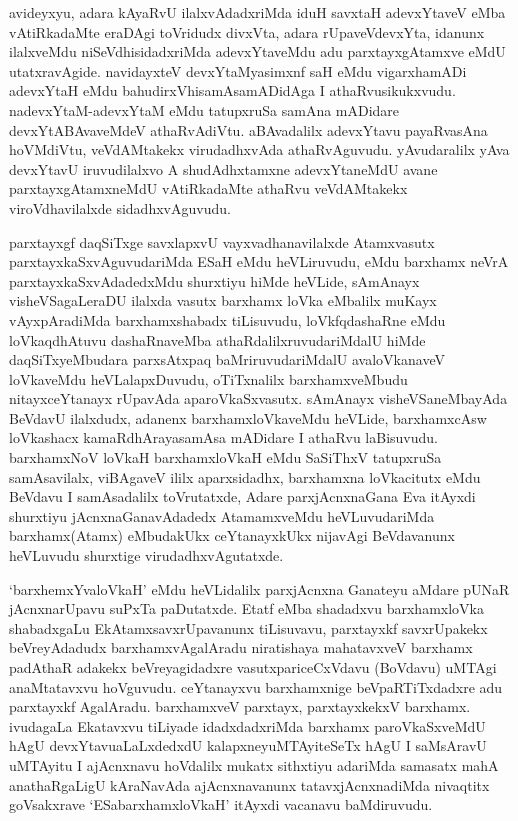 \begin{artha}
avideyxyu, adara kAyaRvU ilalxvAdadxriMda iduH savxtaH adevxYtaveV \stext eMba vAtiRkadaMte eraDAgi toVridudx divxVta, adara rUpaveVdevxYta, idanunx ilalxveMdu niSeVdhisidadxriMda adevxYtaveMdu adu parxtayxgAtamxve eMdU utatxravAgide. navidayxteV devxYtaMyasimxnf saH eMdu vigarxhamADi adevxYtaH eMdu bahudirxVhisamAsamADidAga I athaRvusikukxvudu. nadevxYtaM-adevxYtaM eMdu tatupxruSa samAna mADidare devxYtABAvaveMdeV athaRvAdiVtu. aBAvadalilx adevxYtavu payaRvasAna hoVMdiVtu, veVdAMtakekx virudadhxvAda athaRvAguvudu. yAvudaralilx yAva devxYtavU iruvudilalxvo A shudAdhxtamxne adevxYtaneMdU avane parxtayxgAtamxneMdU vAtiRkadaMte athaRvu veVdAMtakekx viroVdhavilalxde sidadhxvAguvudu. 
\end{artha}%


\begin{artha}
parxtayxgf daqSiTxge savxlapxvU vayxvadhanavilalxde Atamxvasutx parxtayxkaSxvAguvudariMda ESaH eMdu heVLiruvudu, \stext eMdu barxhamx neVrA parxtayxkaSxvAdadedxMdu shurxtiyu hiMde heVLide, sAmAnayx visheVSagaLeraDU ilalxda vasutx barxhamx loVka eMbalilx muKayx vAyxpAradiMda barxhamxshabadx tiLisuvudu, loVkfqdashaRne eMdu loVkaqdhAtuvu dashaRnaveMba athaRdalilxruvudariMdalU hiMde daqSiTxyeMbudara parxsAtxpaq baMriruvudariMdalU avaloVkanaveV loVkaveMdu heVLalapxDuvudu, oTiTxnalilx barxhamxveMbudu nitayxceYtanayx rUpavAda aparoVkaSxvasutx. sAmAnayx visheVSaneMbayAda BeVdavU ilalxdudx, adanenx barxhamxloVkaveMdu heVLide, barxhamxcAsw loVkashacx kamaRdhArayasamAsa mADidare I athaRvu laBisuvudu. barxhamxNoV loVkaH barxhamxloVkaH eMdu SaSiThxV tatupxruSa samAsavilalx, viBAgaveV ililx aparxsidadhx, barxhamxna loVkacitutx eMdu BeVdavu I samAsadalilx toVrutatxde, Adare parxjAcnxnaGana Eva itAyxdi shurxtiyu jAcnxnaGanavAdadedx AtamamxveMdu heVLuvudariMda barxhamx(Atamx) eMbudakUkx ceYtanayxkUkx nijavAgi BeVdavanunx heVLuvudu shurxtige virudadhxvAgutatxde.
\end{artha}

\begin{artha}%
`barxhemxYvaloVkaH' eMdu heVLidalilx parxjAcnxna Ganateyu aMdare pUNaR jAcnxnarUpavu suPxTa paDutatxde. Etatf eMba shadadxvu barxhamxloVka shabadxgaLu EkAtamxsavxrUpavanunx tiLisuvavu, parxtayxkf savxrUpakekx beVreyAdadudx barxhamxvAgalAradu niratishaya mahatavxveV barxhamx padAthaR adakekx beVreyagidadxre vasutxpariceCxVdavu (BoVdavu) uMTAgi anaMtatavxvu hoVguvudu. ceYtanayxvu barxhamxnige beVpaRTiTxdadxre adu parxtayxkf AgalAradu. barxhamxveV parxtayx, parxtayxkekxV barxhamx. ivudagaLa Ekatavxvu tiLiyade idadxdadxriMda barxhamx paroVkaSxveMdU hAgU devxYtavuaLaLxdedxdU kalapxneyuMTAyiteSeTx hAgU I saMsAravU uMTAyitu I ajAcnxnavu hoVdalilx mukatx sithxtiyu adariMda samasatx mahA anathaRgaLigU kAraNavAda ajAcnxnavanunx tatavxjAcnxnadiMda nivaqtitx goVsakxrave `ESabarxhamxloVkaH' itAyxdi vacanavu baMdiruvudu. 
\end{artha}

